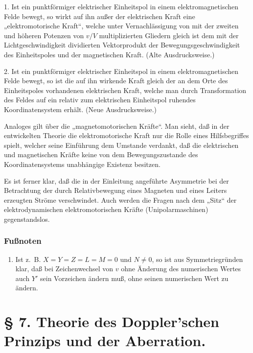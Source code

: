 \documentclass[17pt]{webarticle}       %
\begin{document}
1. Ist ein punktförmiger elektrischer Einheitspol in einem elektromagnetischen Felde bewegt, so wirkt auf ihn außer der elektrischen Kraft eine „elektromotorische Kraft“, welche unter Vernachlässigung von mit der zweiten und höheren Potenzen von \( v/V \) multiplizierten Gliedern gleich ist dem mit der Lichtgeschwindigkeit dividierten Vektorprodukt der Bewegungsgeschwindigkeit des Einheitspoles und der magnetischen Kraft. (Alte Ausdrucksweise.)

2. Ist ein punktförmiger elektrischer Einheitspol in einem elektromagnetischen Felde bewegt, so ist die auf ihn wirkende Kraft gleich der an dem Orte des Einheitspoles vorhandenen elektrischen Kraft, welche man durch Transformation des Feldes auf ein relativ zum elektrischen Einheitspol ruhendes Koordinatensystem erhält. (Neue Ausdrucksweise.)

Analoges gilt über die „magnetomotorischen Kräfte“. Man sieht, daß in der entwickelten Theorie die elektromotorische Kraft nur die Rolle eines Hilfsbegriffes spielt, welcher seine Einführung dem Umstande verdankt, daß die elektrischen und magnetischen Kräfte keine von dem Bewegungszustande des Koordinatensystems unabhängige Existenz besitzen.

Es ist ferner klar, daß die in der Einleitung angeführte Asymmetrie bei der Betrachtung der durch Relativbewegung eines Magneten und eines Leiters erzeugten Ströme verschwindet. Auch werden die Fragen nach dem „Sitz“ der elektrodynamischen elektromotorischen Kräfte (Unipolarmaschinen) gegenstandslos.

\subsubsection*{Fußnoten}

\begin{enumerate}
\item\label{footnote-4} Ist z.~B. \( X = Y = Z = L = M = 0 \) und \( N ≠ 0 \), so ist aus Symmetriegründen klar, daß bei Zeichenwechsel von \( v \) ohne Änderung des numerischen Wertes auch \( Y' \) sein Vorzeichen ändern muß, ohne seinen numerischen Wert zu ändern.
\end{enumerate}

\section*{§ 7. Theorie des Doppler'schen Prinzips und der Aberration.}
\end{document}
